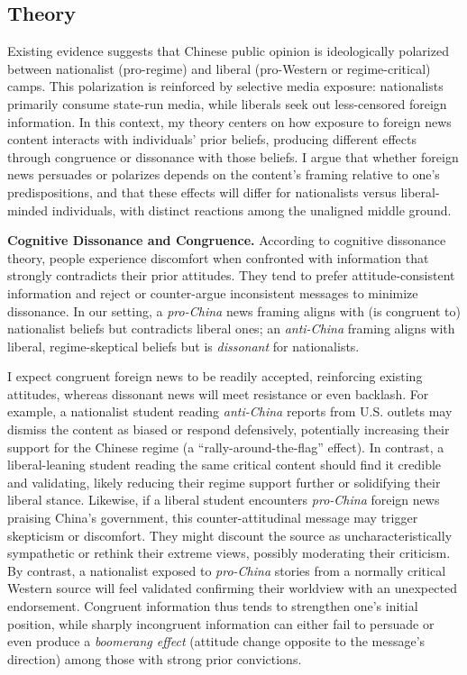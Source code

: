 \documentclass[12pt, american]{article}
\begin{document}
\subsection{Theory}

Existing evidence suggests that Chinese public opinion is ideologically polarized between nationalist (pro-regime) and liberal (pro-Western or regime-critical) camps. This polarization is reinforced by selective media exposure: nationalists primarily consume state-run media, while liberals seek out less-censored foreign information. In this context, my theory centers on how exposure to foreign news content interacts with individuals’ prior beliefs, producing different effects through congruence or dissonance with those beliefs. I argue that whether foreign news persuades or polarizes depends on the content’s framing relative to one’s predispositions, and that these effects will differ for  nationalists versus liberal-minded individuals, with distinct reactions among the unaligned middle ground.

\textbf{Cognitive Dissonance and Congruence.} According to cognitive dissonance theory, people experience discomfort when confronted with information that strongly contradicts their prior attitudes. They tend to prefer attitude-consistent information and reject or counter-argue inconsistent messages to minimize dissonance. In our setting, a \textit{pro-China} news framing aligns with (is congruent to) nationalist beliefs but contradicts liberal ones; an \textit{anti-China} framing aligns with liberal, regime-skeptical beliefs but is \textit{dissonant} for nationalists. 

I expect congruent foreign news to be readily accepted, reinforcing existing attitudes, whereas dissonant news will meet resistance or even backlash. For example, a nationalist student reading \textit{anti-China} reports from U.S. outlets may dismiss the content as biased or respond defensively, potentially increasing their support for the Chinese regime (a ``rally-around-the-flag'' effect). In contrast, a liberal-leaning student reading the same critical content should find it credible and validating, likely reducing their regime support further or solidifying their liberal stance. Likewise, if a liberal student encounters \textit{pro-China} foreign news praising China’s government, this counter-attitudinal message may trigger skepticism or discomfort. They might discount the source as uncharacteristically sympathetic or rethink their extreme views, possibly moderating their criticism. By contrast, a nationalist exposed to \textit{pro-China} stories from a normally critical Western source will feel validated confirming their worldview with an unexpected endorsement. Congruent information thus tends to strengthen one’s initial position, while sharply incongruent information can either fail to persuade or even produce a \textit{boomerang effect} (attitude change opposite to the message’s direction) among those with strong prior convictions.
\end{document}
